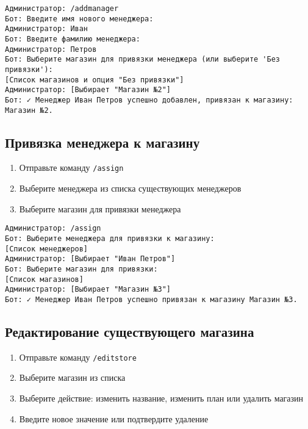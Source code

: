 \documentclass[a4paper,12pt]{article}
\begin{document}
\begin{tcolorbox}[colback=green!5, title=Пример добавления менеджера]
\begin{verbatim}
Администратор: /addmanager
Бот: Введите имя нового менеджера:
Администратор: Иван
Бот: Введите фамилию менеджера:
Администратор: Петров
Бот: Выберите магазин для привязки менеджера (или выберите 'Без привязки'):
[Список магазинов и опция "Без привязки"]
Администратор: [Выбирает "Магазин №2"]
Бот: ✓ Менеджер Иван Петров успешно добавлен, привязан к магазину: Магазин №2.
\end{verbatim}
\end{tcolorbox}

\subsection{Привязка менеджера к магазину}
\begin{enumerate}
    \item Отправьте команду \texttt{/assign}
    \item Выберите менеджера из списка существующих менеджеров
    \item Выберите магазин для привязки менеджера
\end{enumerate}

\begin{tcolorbox}[colback=green!5, title=Пример привязки менеджера]
\begin{verbatim}
Администратор: /assign
Бот: Выберите менеджера для привязки к магазину:
[Список менеджеров]
Администратор: [Выбирает "Иван Петров"]
Бот: Выберите магазин для привязки:
[Список магазинов]
Администратор: [Выбирает "Магазин №3"]
Бот: ✓ Менеджер Иван Петров успешно привязан к магазину Магазин №3.
\end{verbatim}
\end{tcolorbox}

\subsection{Редактирование существующего магазина}
\begin{enumerate}
    \item Отправьте команду \texttt{/editstore}
    \item Выберите магазин из списка
    \item Выберите действие: изменить название, изменить план или удалить магазин
    \item Введите новое значение или подтвердите удаление
\end{enumerate}
\end{document}
